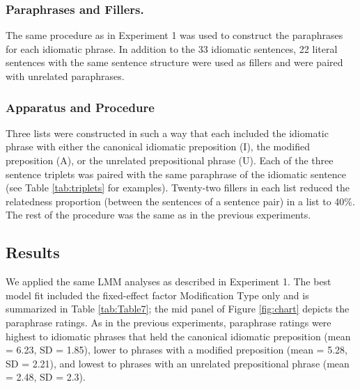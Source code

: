 \documentclass[output=paper]{langsci/langscibook}
\begin{document}
\subsubsection{Paraphrases and Fillers.}
The same procedure as in Experiment 1 was used to construct the paraphrases for each idiomatic phrase. In addition to the 33 idiomatic sentences, 22 literal sentences with the same sentence structure were used as fillers and were paired with unrelated paraphrases.

\subsubsection{Apparatus and Procedure}

Three lists were constructed in such a way that each included the idiomatic phrase with either the canonical idiomatic preposition (I), the modified preposition (A), or the unrelated prepositional phrase (U). Each of the three sentence triplets was paired with the same paraphrase of the idiomatic sentence (see Table \ref{tab:triplets} for examples). Twenty-two fillers in each list reduced the relatedness proportion (between the sentences of a sentence pair) in a list to 40\%. The rest of the procedure was the same as in the previous experiments. 

\subsection{Results}

We applied the same LMM analyses as described in Experiment 1. The best model fit included the fixed-effect factor Modification Type only and is summarized in Table \ref{tab:Table7}; the mid panel of Figure \ref{fig:chart} depicts the paraphrase ratings. As in the previous experiments, paraphrase ratings were highest to idiomatic phrases that held the canonical idiomatic preposition (mean = 6.23, SD = 1.85), lower to phrases with a modified preposition (mean = 5.28, SD = 2.21), and lowest to phrases with an unrelated prepositional phrase (mean = 2.48, SD = 2.3).
\end{document}
